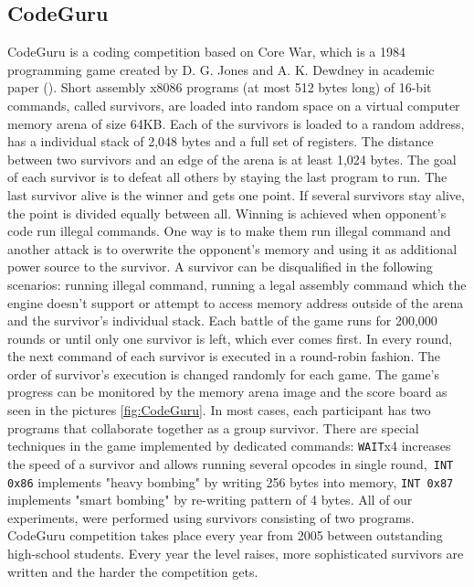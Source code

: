 \documentclass[dvipsnames,format=sigconf,anonymous=true,review=true]{acmart}
\begin{document}
\subsection{CodeGuru}
\label{codeguru_explenation}
CodeGuru\cite{codeguru_repo} is a coding competition based on Core War, which is a 1984 programming game created by D. G. Jones and A. K. Dewdney in academic paper (\cite{dewdney1984recreational}).
Short assembly x8086 programs (at most 512 bytes long) of 16-bit commands, called survivors, are loaded into random space on a virtual computer memory arena of size 64KB. Each of the survivors is loaded to a random address, has a individual stack of 2,048 bytes and a full set of registers. The distance between two survivors and an edge of the arena is at least 1,024 bytes.
The goal of each survivor is to defeat all others by staying the last program to run. The last survivor alive is the winner and gets one point. If several survivors stay alive, the point is divided equally between all.
Winning is achieved when opponent's code run illegal commands. One way is to make them run illegal command and another attack is to overwrite the opponent's memory and using it as additional power source to the survivor. A survivor can be disqualified in the following scenarios: 
running illegal command, running a legal assembly command which the engine doesn't support or attempt to access memory address outside of the arena and the survivor's individual stack.
Each battle of the game runs for 200,000 rounds or until only one survivor is left, which ever comes first. In every round, the next command of each survivor is executed in a round-robin fashion. The order of survivor's execution is changed randomly for each game. The game's progress can be monitored by the memory arena image and the score board as seen in the pictures \autoref{fig:CodeGuru}. In most cases, each participant has two programs that collaborate together as a group survivor. There are special techniques in the game implemented by dedicated commands: \texttt{WAIT}x4 increases the speed of a survivor and allows running several opcodes in single round,\texttt{
INT 0x86} implements "heavy bombing" by writing 256 bytes into memory, \texttt{INT 0x87} implements "smart bombing" by re-writing pattern of 4 bytes. All of our experiments, were performed using survivors consisting of two programs.
CodeGuru competition takes place every year from 2005 between outstanding high-school students. Every year the level raises, more sophisticated survivors are written and the harder the competition gets.
\end{document}

